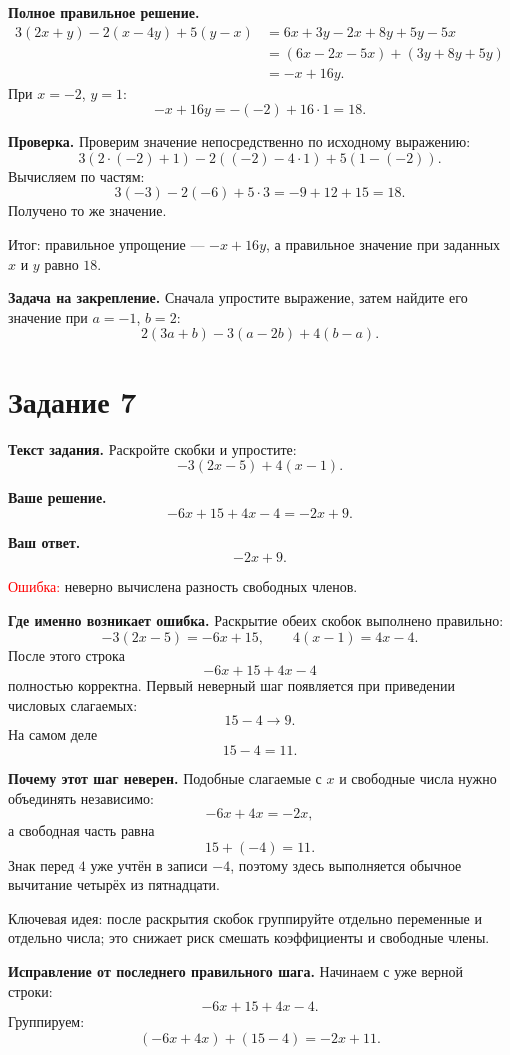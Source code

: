 \documentclass[12pt,a4paper]{article}
\begin{document}
\textbf{Полное правильное решение.}
\[
\begin{aligned}
3(2x+y)-2(x-4y)+5(y-x)
&=6x+3y-2x+8y+5y-5x\\
&=(6x-2x-5x)+(3y+8y+5y)\\
&=-x+16y.
\end{aligned}
\]
При $x=-2$, $y=1$:
\[
-x+16y=-(-2)+16\cdot 1=18.
\]

\textbf{Проверка.}
Проверим значение непосредственно по исходному выражению:
\[
3(2\cdot(-2)+1)-2((-2)-4\cdot 1)+5(1-(-2)).
\]
Вычисляем по частям:
\[
3(-3)-2(-6)+5\cdot 3=-9+12+15=18.
\]
Получено то же значение.

\textcolor{teal!60!black}{Итог:} правильное упрощение --- $-x+16y$, а правильное значение при заданных $x$ и $y$ равно $18$.

\textbf{Задача на закрепление.}
Сначала упростите выражение, затем найдите его значение при $a=-1$, $b=2$:
\[
2(3a+b)-3(a-2b)+4(b-a).
\]

\newpage
{}\label{task:7}
\section*{Задание 7}

\textbf{Текст задания.}
Раскройте скобки и упростите:
\[
-3(2x-5)+4(x-1).
\]

\textbf{Ваше решение.}
\[
-6x+15+4x-4=-2x+9.
\]

\textbf{Ваш ответ.}
\[
-2x+9.
\]

\textcolor{red}{Ошибка:} неверно вычислена разность свободных членов.

\textbf{Где именно возникает ошибка.}
Раскрытие обеих скобок выполнено правильно:
\[
-3(2x-5)=-6x+15,
\qquad
4(x-1)=4x-4.
\]
После этого строка
\[
-6x+15+4x-4
\]
полностью корректна. Первый неверный шаг появляется при приведении числовых слагаемых:
\[
15-4\rightarrow 9.
\]
На самом деле
\[
15-4=11.
\]

\textbf{Почему этот шаг неверен.}
Подобные слагаемые с $x$ и свободные числа нужно объединять независимо:
\[
-6x+4x=-2x,
\]
а свободная часть равна
\[
15+(-4)=11.
\]
Знак перед $4$ уже учтён в записи $-4$, поэтому здесь выполняется обычное вычитание четырёх из пятнадцати.

\textcolor{blue!60!black}{Ключевая идея:} после раскрытия скобок группируйте отдельно переменные и отдельно числа; это снижает риск смешать коэффициенты и свободные члены.

\textbf{Исправление от последнего правильного шага.}
Начинаем с уже верной строки:
\[
-6x+15+4x-4.
\]
Группируем:
\[
(-6x+4x)+(15-4)=-2x+11.
\]
\end{document}
